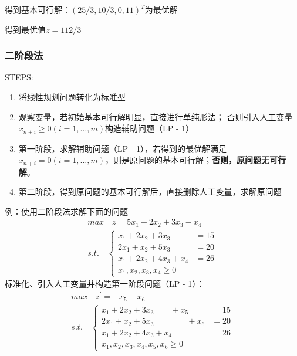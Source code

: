 \documentclass{book}
\begin{document}
    得到基本可行解：$(25/3,10/3,0,11)^T$为最优解
    
    得到最优值$z=112/3$

\subsubsection{二阶段法}
STEPS:
\begin{enumerate}
    \item 将线性规划问题转化为标准型
    \item 观察变量，若初始基本可行解明显，直接进行单纯形法；
    否则引入人工变量 $x_{n+i} \ge 0 (i= 1 , … , m)$构造辅助问题（LP - 1）
    \item 第一阶段，求解辅助问题（LP - 1），若得到的最优解满足 $x_{n+i} = 0 (i= 1 , … , m)$，则是原问题的基本可行解；\textbf{否则，原问题无可行解}。
    \item 第二阶段，得到原问题的基本可行解后，直接删除人工变量，求解原问题
\end{enumerate}

例：使用二阶段法求解下面的问题
$$
\begin{aligned}
    &max\quad z=5x_1+2x_2+3x_3-x_4&\\
    &s.t.\quad
    \begin{cases}
        x_1+2x_2+3x_3&= 15\\
        2x_1+x_2+5x_3&= 20\\
        x_1+2x_2+4x_3+x_4&= 26\\
        x_1,x_2,x_3,x_4\ge0
    \end{cases}
\end{aligned}
$$
标准化、引入人工变量并构造第一阶段问题（LP - 1）：
$$
\begin{aligned}
    &max\quad z^{\prime}=-x_5-x_6&\\
    &s.t.\quad
    \begin{cases}
        x_1+2x_2+3x_3\qquad+x_5&= 15\\
        2x_1+x_2+5x_3\qquad\qquad+x_6&= 20\\
        x_1+2x_2+4x_3+x_4&= 26\\
        x_1,x_2,x_3,x_4,x_5,x_6\ge0
    \end{cases}
\end{aligned}
$$
\end{document}
